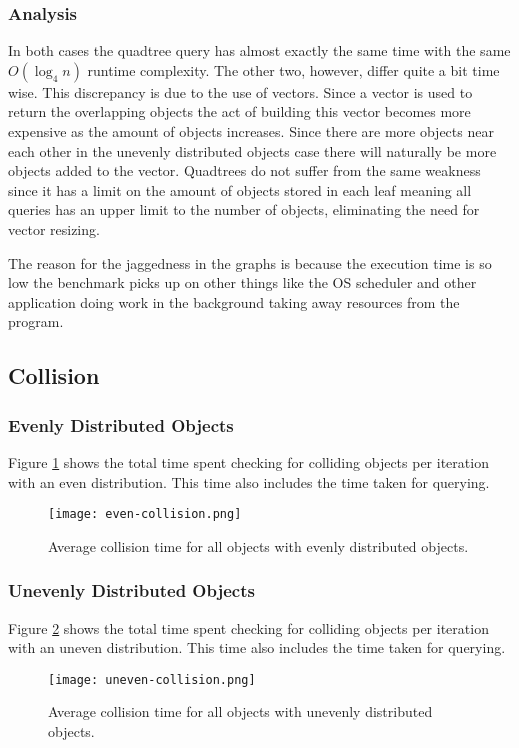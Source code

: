 \documentclass[a4paper, 12pt]{article}
\begin{document}
\subsubsection{Analysis}
In both cases the quadtree query has almost exactly the same time with the same
$O(\log_4 n)$ runtime complexity. The other two, however, differ quite a bit
time wise. This discrepancy is due to the use of vectors. Since a vector is used
to return the overlapping objects the act of building this vector becomes more
expensive as the amount of objects increases. Since there are more objects near
each other in the unevenly distributed objects case there will naturally be more
objects added to the vector. Quadtrees do not suffer from the same weakness
since it has a limit on the amount of objects stored in each leaf meaning all
queries has an upper limit to the number of objects, eliminating the need for
vector resizing.

The reason for the jaggedness in the graphs is because the execution time is so
low the benchmark picks up on other things like the OS scheduler and other
application doing work in the background taking away resources from the
program.

\subsection{Collision}

\subsubsection{Evenly Distributed Objects}
Figure \ref{fig:even-collision} shows the total time spent checking for
colliding objects per iteration with an even distribution. This time also
includes the time taken for querying.
\begin{figure}[H]
    \centering
    \caption{Average collision time for all objects with evenly distributed
    objects.}
    \texttt{[image: even-collision.png]}
    \label{fig:even-collision}
\end{figure}

\subsubsection{Unevenly Distributed Objects}
Figure \ref{fig:uneven-collision} shows the total time spent checking for
colliding objects per iteration with an uneven distribution. This time also
includes the time taken for querying.
\begin{figure}[H]
    \centering
    \caption{Average collision time for all objects with unevenly distributed
    objects.}
    \texttt{[image: uneven-collision.png]}
    \label{fig:uneven-collision}
\end{figure}
\end{document}
